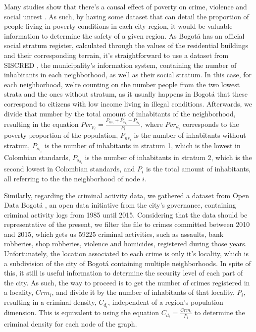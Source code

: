 \documentclass[runningheads]{llncs}
\begin{document}
Many studies show that there's a causal effect of poverty on crime, violence and social unrest \cite{iyer_poverty_2014} \cite{lagi_food_2011}. As such, by having some dataset that can detail the proportion of people living in poverty conditions in each city region, it would be valuable information to determine the safety of a given region. As Bogotá has an official social stratum register, calculated through the values of the residential buildings and their corresponding terrain, it's straightforward to use a dataset from SISCRED \cite{secretaria_de_cultura_recreacion_y_deporte_siscred_nodate}, the municipality's information system, containing the number of inhabitants in each neighborhood, as well as their social stratum. In this case, for each neighborhood, we're counting on the number people from the two lowest strata and the ones without stratum, as it usually happens in Bogotá that these correspond to citizens with low income living in illegal conditions. Afterwards, we divide that number by the total amount of inhabitants of the neighborhood, resulting in the equation $Pvr_{p_i} = \frac{P_{ns_i} + P_{s_{1_i}} + P_{s_{2_i}}}{P_i}$, where $Pvr_{d_i}$ corresponds to the poverty proportion of the population, $P_{ns_i}$ is the number of inhabitants without stratum, $P_{s_{1_i}}$ is the number of inhabitants in stratum 1, which is the lowest in Colombian standards, $P_{s_{2_i}}$ is the number of inhabitants in stratum 2, which is the second lowest in Colombian standards, and $P_i$ is the total amount of inhabitants, all referring to the the neighborhood of node $i$.

Similarly, regarding the criminal activity data, we gathered a dataset from Open Data Bogotá \cite{camara_de_comercio_de_bogota_open_nodate}, an open data initiative from the city's governance, containing criminal activity logs from 1985 until 2015. Considering that the data should be representative of the present, we filter the file to crimes committed between 2010 and 2015, which gets us 59225 criminal activities, such as assaults, bank robberies, shop robberies, violence and homicides, registered during those years. Unfortunately, the location associated to each crime is only it's locality, which is a subdivision of the city of Bogotá containing multiple neighborhoods. In spite of this, it still is useful information to determine the security level of each part of the city. As such, the way to proceed is to get the number of crimes registered in a locality, $Crm_i$, and divide it by the number of inhabitants of that locality, $P_i$, resulting in a criminal density, $C_{d_i}$, independent of a region's population dimension. This is equivalent to using the equation $C_{d_i} = \frac{Crm_i}{P_i}$ to determine the criminal density for each node of the graph.
\end{document}

